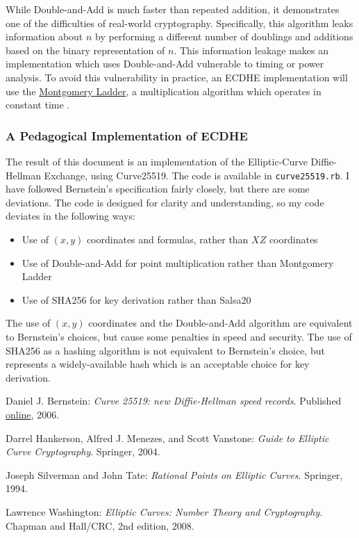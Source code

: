 \documentclass{article}
\begin{document}
While Double-and-Add is much faster than repeated addition, it demonstrates one of the difficulties of real-world cryptography.
Specifically, this algorithm leaks information about $n$ by performing a different number of doublings and additions based on the binary representation of $n$.
This information leakage makes an implementation which uses Double-and-Add vulnerable to timing or power analysis.
To avoid this vulnerability in practice, an ECDHE implementation will use the \href{http://safecurves.cr.yp.to/ladder.html}{Montgomery Ladder}, a multiplication algorithm which operates in constant time \cite[\S 3.3]{ecc-guide}. 

\subsubsection{A Pedagogical Implementation of ECDHE}
The result of this document is an implementation of the Elliptic-Curve Diffie-Hellman Exchange, using Curve25519.
The code is available in \texttt{curve25519.rb}.
I have followed Bernstein's specification fairly closely, but there are some deviations.
The code is designed for clarity and understanding, so my code deviates in the following ways:
\begin{itemize}
\item Use of $(x,y)$ coordinates and formulas, rather than $XZ$ coordinates
\item Use of Double-and-Add for point multiplication rather than Montgomery Ladder
\item Use of SHA256 for key derivation rather than Salsa20
\end{itemize}

The use of $(x,y)$ coordinates and the Double-and-Add algorithm are equivalent to Bernstein's choices, but cause some penalties in speed and security.
The use of SHA256 as a hashing algorithm is not equivalent to Bernstein's choice, but represents a widely-available hash which is an acceptable choice for key derivation.

\clearpage

\begin{thebibliography}{9}

	Daniel J. Bernstein:
	\emph{Curve 25519: new Diffie-Hellman speed records}.
	Published \href{http://cr.yp.to/ecdh/curve25519-20060209.pdf}{online},
	2006.

	Darrel Hankerson, Alfred J. Menezes, and Scott Vanstone:
	\emph{Guide to Elliptic Curve Cryptography}.
	Springer,
	2004.

	Joseph Silverman and John Tate:
	\emph{Rational Points on Elliptic Curves}.
	Springer,
	1994.

	Lawrence Washington:
	\emph{Elliptic Curves: Number Theory and Cryptography}.
	Chapman and Hall/CRC,
	2nd edition,
	2008.

\end{thebibliography}
\end{document}
